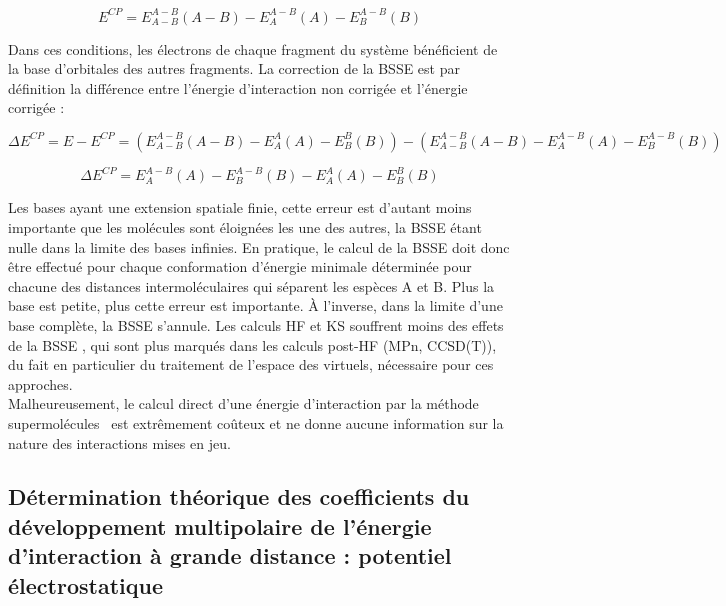 	\begin{equation}
	E^{CP} = E_{A-B}^{A-B}(A-B) - E_{A}^{A-B}(A) - E_{B}^{A-B}(B)
	\end{equation}
	
	Dans ces conditions, les électrons de chaque fragment du système bénéficient de la base d'orbitales des autres fragments. La correction de la BSSE est par définition la différence entre l'énergie d'interaction non corrigée et l'énergie corrigée :
	
	\begin{equation}
	\Delta E^{CP} = E - E^{CP} = (E_{A-B}^{A-B}(A-B) - E_{A}^{A}(A) - E_{B}^{B}(B)) - (E_{A-B}^{A-B}(A-B) - E_{A}^{A-B}(A) - E_{B}^{A-B}(B))
	\end{equation}
	
	\begin{equation}
	\Delta E^{CP} =  E_{A}^{A-B}(A) - E_{B}^{A-B}(B) - E_{A}^{A}(A) - E_{B}^{B}(B)
	\end{equation}
	
	Les bases ayant une extension spatiale finie, cette erreur est d'autant moins importante que les molécules sont éloignées les une des autres, la BSSE étant nulle dans la limite des bases infinies. En pratique, le calcul de la BSSE doit donc être effectué pour chaque conformation d’énergie minimale déterminée pour chacune des distances intermoléculaires qui séparent les espèces A et B. Plus la base est petite, plus cette erreur est importante. À l'inverse, dans la limite d’une base complète, la BSSE s’annule.
	Les calculs HF et KS souffrent moins des effets de la BSSE \cite{garza2005role}, qui sont plus marqués dans les calculs post-HF (MPn, CCSD(T)), du fait en particulier du traitement de l’espace des virtuels, nécessaire pour ces approches.\\
	
	
	Malheureusement, le calcul direct d’une énergie d’interaction par la méthode \og supermolécules \fg{} est extrêmement coûteux et ne donne aucune information sur la nature des interactions mises en jeu.\\
	
	\subsection{Détermination théorique des coefficients du développement multipolaire de l’énergie d'interaction à grande distance : potentiel électrostatique}
	
